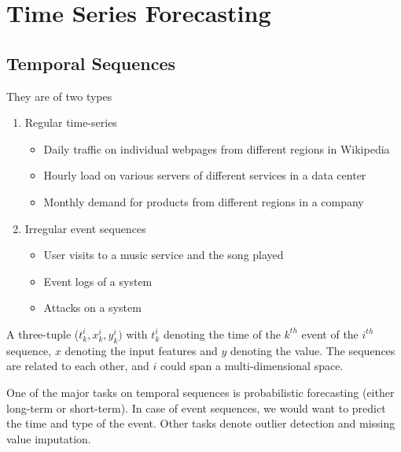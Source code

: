 \section{Time Series Forecasting}
\subsection{Temporal Sequences}
They are of two types
\begin{enumerate}
	\item Regular time-series
	\begin{itemize}
		\item Daily traffic on individual webpages from different regions in Wikipedia
		\item Hourly load on various servers of different services in a data center
		\item Monthly demand for products from different regions in a company
	\end{itemize}
	\item Irregular event sequences
	\begin{itemize}
		\item User visits to a music service and the song played
		\item Event logs of a system
		\item Attacks on a system
	\end{itemize}
\end{enumerate}
\begin{defn}
A three-tuple ($t_k^i, x_k^i, y_k^i)$ with $t_k^i$ denoting the time of the $k^{th}$ event of the $i^{th}$ sequence, $x$ denoting the input features and $y$ denoting the value. The sequences are related to each other, and $i$ could span a multi-dimensional space.
\end{defn}
One of the major tasks on temporal sequences is probabilistic forecasting (either long-term or short-term). In case of event sequences, we would want to predict the time and type of the event. Other tasks denote outlier detection and missing value imputation. 
